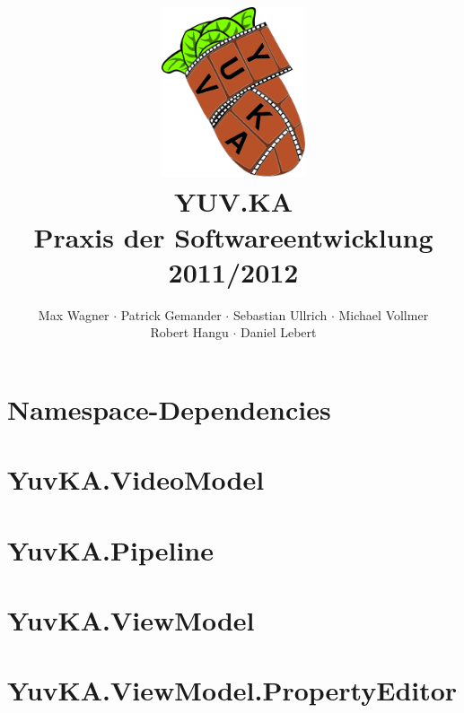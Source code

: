 \documentclass{scrartcl}
\begin{document}
\title{
    \hspace{-0.5cm} \includegraphics[height=5cm]{logo.png} \\[1cm]
    \Huge{YUV.KA} \\ \large{Praxis der Softwareentwicklung 2011/2012}
}
\author{Max Wagner $\cdot$ Patrick Gemander $\cdot$ Sebastian Ullrich $\cdot$ Michael Vollmer \\ Robert Hangu $\cdot$ Daniel Lebert}
\maketitle

\newpage
\mbox{}
\newpage
\mbox{}

\tableofcontents

\section{Namespace-Dependencies}

\clearpage

\section{YuvKA.VideoModel}

\clearpage

\section{YuvKA.Pipeline}







\section{YuvKA.ViewModel}




\section{YuvKA.ViewModel.PropertyEditor}







\end{document}
